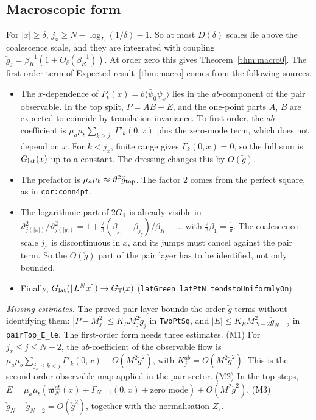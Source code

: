 \documentclass[11pt]{amsart}
\theoremstyle{definition}
\theoremstyle{remark}
\numberwithin{equation}{section}
\newcommand{\T}{\mathbb{T}}
\newcommand{\avg}[1]{\langle #1\rangle}
\begin{document}
\subsection{Macroscopic form}\label{sec:macro}
For $|x|\ge\delta$, $j_x\ge N-\log_L(1/\delta)-1$. So at most $D(\delta)$ scales lie above the
coalescence scale, and they are integrated with coupling $\check g_j=\beta_R^{-1}(1+O_\delta(\beta_R^{-1}))$.
At order zero this gives Theorem~\ref{thm:macro0}. The first-order term of Expected result~\ref{thm:macro} comes from
the following sources.
\begin{itemize}
\item The $x$-dependence of $P_\epsilon(x)=b\avg{\bar\psi_0\psi_x}$ lies in the $ab$-component of the pair observable. In the
top split, $P=AB-E$, and the one-point parts $A$, $B$ are expected to coincide by translation invariance. To first
order, the $ab$-coefficient is $\mu_a\mu_b\sum_{k\ge j_x}\Gamma'_k(0,x)$ plus the zero-mode term, which does not depend
on $x$. For $k<j_x$, finite range gives $\Gamma_k(0,x)=0$, so the full sum is $G_{\rm lat}(x)$ up to a constant. The
dressing changes this by $O(\check g)$.
\item The prefactor is $\mu_a\mu_b\approx\vartheta^2\check g_{\rm top}$. The factor $2$ comes from the perfect square, as in
\texttt{cor:conn4pt}.
\item The logarithmic part of $2G_\T$ is already visible in
$\vartheta^2_{j(|x|)}/\vartheta^2_{j(|y|)}=1+\frac23(\beta_{j_x}-\beta_{j_y})/\beta_R+\dots$ with $\frac23\beta_1=\frac1\pi$.
The coalescence scale $j_x$ is discontinuous in $x$, and its jumps must cancel against the pair term. So the
$O(\check g)$ part of the pair layer has to be identified, not only bounded.
\item Finally, $G_{\rm lat}(\lfloor L^Nx\rceil)\to G_\T(x)$ (\texttt{latGreen\_latPtN\_tendstoUniformlyOn}).
\end{itemize}
\emph{Missing estimates.} The proved pair layer bounds the order-$\check g$ terms without identifying them:
$|P-M_{j}^2|\le K_PM_j^2\check g_j$ in \texttt{TwoPtSq}, and $|E|\le K_EM^2_{N-2}\check g_{N-2}$ in \texttt{pairTop\_E\_le}. The
first-order form needs three estimates.
(M1) For $j_x\le j\le N-2$, the $ab$-coefficient of the observable flow is
$\mu_a\mu_b\sum_{j_x\le k<j}\Gamma'_k(0,x)+O(M^2\check g^2)$, with $K^{ab}_j=O(M^2\check g^2)$. This is the second-order
observable map applied in the pair sector.
(M2) In the top steps, $E=\mu_a\mu_b(\mathfrak w^{ab}_N(x)+\Gamma_{N-1}(0,x)+\text{zero mode})+O(M^2\check g^2)$.
(M3) $\check g_N-\check g_{N-2}=O(\check g^2)$, together with the normalisation $Z_\epsilon$.
\end{document}
